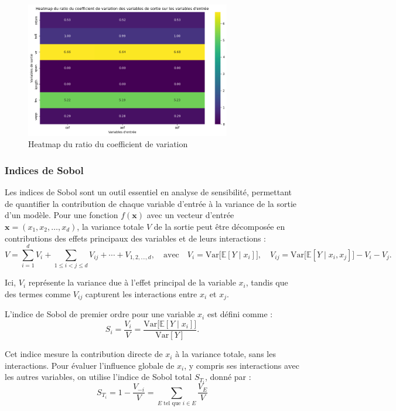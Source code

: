 \documentclass[a4paper, 11pt]{article}
\begin{document}
\begin{figure}[H]
\centering
\includegraphics[width=0.8\textwidth]{Images_Ayoub/Problem2/UseCase1/Estimating_Quantities/Coefficient_De_Variation/Ratio_Coefficient_Variation.png}
\caption{Heatmap du ratio du coefficient de variation}
\label{fig:image2}
\end{figure}



\subsubsection{Indices de Sobol}
Les indices de Sobol sont un outil essentiel en analyse de sensibilité, permettant de quantifier la contribution de chaque variable d'entrée à la variance de la sortie d'un modèle. Pour une fonction \( f(\mathbf{x}) \) avec un vecteur d'entrée \( \mathbf{x} = (x_1, x_2, \dots, x_d) \), la variance totale \( V \) de la sortie peut être décomposée en contributions des effets principaux des variables et de leurs interactions :
\[
V = \sum_{i=1}^d V_i + \sum_{1 \leq i < j \leq d} V_{ij} + \cdots + V_{1,2,\dots,d},
\quad \text{avec} \quad
V_i = \mathrm{Var}\big[\mathbb{E}[Y \mid x_i]\big],
\quad
V_{ij} = \mathrm{Var}\big[\mathbb{E}[Y \mid x_i, x_j]\big] - V_i - V_j.
\]

Ici, \( V_i \) représente la variance due à l'effet principal de la variable \( x_i \), tandis que des termes comme \( V_{ij} \) capturent les interactions entre \( x_i \) et \( x_j \).  \newline

L'indice de Sobol de premier ordre pour une variable \( x_i \) est défini comme :
\[
S_i = \frac{V_i}{V} = \frac{\mathrm{Var}\big[\mathbb{E}[Y \mid x_i]\big]}{\mathrm{Var}[Y]}.
\]

Cet indice mesure la contribution directe de \( x_i \) à la variance totale, sans les interactions. Pour évaluer l'influence globale de \( x_i \), y compris ses interactions avec les autres variables, on utilise l'indice de Sobol total \( S_{T_i} \), donné par :
\[
S_{T_i} = 1 - \frac{V_{-i}}{V} = \sum_{E \text{ tel que } i \in E} \frac{V_E}{V}
\]
\end{document}
